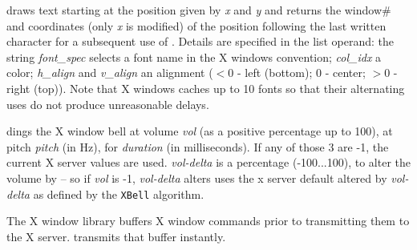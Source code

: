  draws text starting at the position given by \emph{x}
and \emph{y} and returns the window\# and coordinates (only \emph{x}
is modified) of the position following the last written character for
a subsequent use of . Details are specified in the list
operand: the string \emph{font\_spec} selects a font name in the X
windows convention; \emph{col\_idx} a color; \emph{h\_align} and
\emph{v\_align} an alignment ($<$0 - left (bottom); 0 - center; $>0$ -
right (top)). Note that X windows caches up to 10 fonts so that their
alternating uses do not produce unreasonable delays.

 dings the X window bell at volume \emph{vol} (as a positive
percentage up to 100), at pitch \emph{pitch} (in Hz), for
\emph{duration} (in milliseconds). If any of those 3 are -1, the
current X server values are used. \emph{vol-delta} is a percentage
(-100...100), to alter the volume by -- so if \emph{vol} is -1,
\emph{vol-delta} alters uses the x server default altered by
\emph{vol-delta} as defined by the \texttt{XBell} algorithm.
 
The X window library buffers X window commands prior to transmitting
them to the X server.  transmits that buffer instantly.

